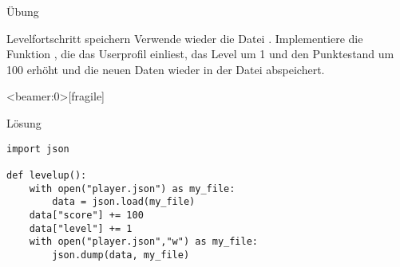 \begin{frame}{Übung}
\begin{block}{Levelfortschritt speichern}
\vspace{2pt}
Verwende wieder die Datei . Implementiere die Funktion , die das Userprofil einliest, das Level um 1 und den Punktestand um 100 erhöht und die neuen Daten wieder in der Datei  abspeichert. 
\end{block}
\end{frame}


\begin{frame}<beamer:0>[fragile]{}
\begin{solutionblock}{Lösung}

\begin{verbatim}
import json 

def levelup(): 
    with open("player.json") as my_file:
        data = json.load(my_file)
    data["score"] += 100
    data["level"] += 1
    with open("player.json","w") as my_file: 
        json.dump(data, my_file)
\end{verbatim}
\end{solutionblock}
\end{frame}






